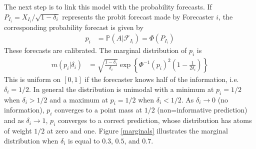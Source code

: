 \documentclass[11pt]{article}
\renewcommand{\P}{\mathbb{P}}
\theoremstyle{definition}
\theoremstyle{definition}
\def\P{{\mathbb P}}
\begin{document}
The next step is to link this model with the probability forecasts. 
If $P_{I_i} = X_{I_i}/\sqrt{1-\delta_i}$ represents the probit 
forecast made by Forecaster $i$, the corresponding probability forecast is given by
\begin{align}
p_i &= \P\left(A | \mathcal{F}_{I_i}\right) = \Phi\left( P_{I_i}\right) 
\label{Indiv}
\end{align}
These forecasts are calibrated. 
The marginal distribution of $p_i$ is
\begin{align*}
m(p_i | \delta_i) &= \sqrt{\frac{1-\delta_i}{\delta_i}} \exp 
   \left\{ \Phi^{-1}(p_i)^2 \left(1-\frac{1}{2 \delta_i} \right) \right\} 
\end{align*}
This is uniform on $[0,1]$ if the forecaster knows half of the information, 
i.e. $\delta_i = 1/2$.  In general the distribution is unimodal with
a minimum at $p_i = 1/2$ when $\delta_i > 1/2$ and a maximum at $p_i = 1/2$
when $\delta_i < 1/2$.  As $\delta_i \to 0$ (no information), $p_i$ converges
to a point mass at $1/2$ (non=informative prediction) and as $\delta_i \to 1$,
$p_i$ converges to a correct prediction, whose distribution has atoms of
weight $1/2$ at zero and one. Figure \ref{marginals} illustrates the marginal distribution when $\delta_i$ is equal to $0.3$, $0.5$, and $0.7$. 
\end{document}
